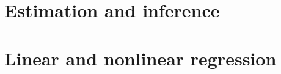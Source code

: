 \documentclass[12pt,notitlepage]{report}
\begin{document}
\chapter{Estimation and inference}






\newcommand*\FancyVerbStartString{## block}




\chapter{Linear and nonlinear regression}










\end{document}
